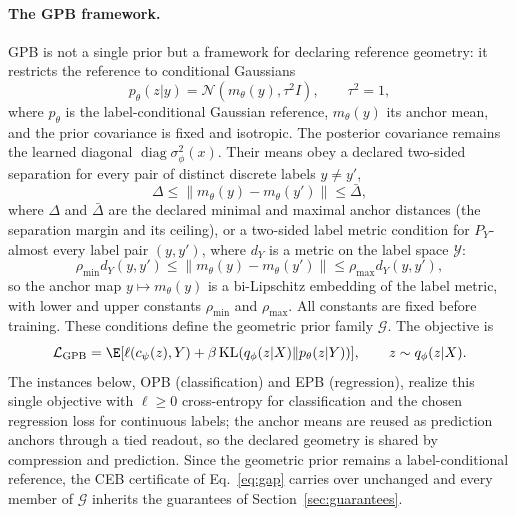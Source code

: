 \paragraph{The GPB framework.}
GPB is not a single prior but a framework for declaring reference geometry: it
restricts the reference to conditional Gaussians
\begin{equation}
p_\theta(z|y)=\mathcal N(m_\theta(y),\tau^2 I),\qquad \tau^2=1,
\label{eq:pgib-covariance}
\end{equation}
where $p_\theta$ is the label-conditional Gaussian reference, $m_\theta(y)$ its
anchor mean, and the prior covariance is fixed and isotropic. The posterior
covariance remains the learned diagonal $\operatorname{diag}\sigma_\phi^2(x)$.
Their means obey a
declared two-sided separation for every pair of distinct discrete labels
$y\ne y'$,
\begin{equation}
\Delta\le\|m_\theta(y)-m_\theta(y')\|\le\bar\Delta,
\label{eq:pgib-separation-condition}
\end{equation}
where $\Delta$ and $\bar\Delta$ are the declared minimal and maximal anchor
distances (the separation margin and its ceiling),
or a two-sided label metric condition for $P_Y$-almost every label pair
$(y,y')$, where $d_Y$ is a metric on the label space $\mathcal Y$:
\begin{equation}
\rho_{\min}d_Y(y,y')\le\|m_\theta(y)-m_\theta(y')\|
\le\rho_{\max}d_Y(y,y'),
\label{eq:pgib-lipschitz}
\end{equation}
so the anchor map $y\mapsto m_\theta(y)$ is a bi-Lipschitz embedding of the label
metric, with lower and upper constants $\rho_{\min}$ and $\rho_{\max}$. All
constants are fixed before training. These conditions define the geometric prior
family $\mathcal G$. The objective is
\begin{equation}
\mathcal L_{\rm GPB}=\E[\ell(c_\psi(z),Y)+\beta\KL(q_\phi(z|X)\|p_\theta(z|Y))],
\qquad z\sim q_\phi(z|X).
\label{eq:pgib-objective}
\end{equation}
The instances below, OPB (classification) and EPB (regression), realize this single
objective with $\ell\ge0$ cross-entropy for classification and the chosen regression
loss for continuous labels; the anchor means are reused as prediction anchors through
a tied readout, so the declared geometry is shared by compression and prediction.
Since the geometric prior remains a label-conditional reference, the CEB certificate
of Eq.~\eqref{eq:gap} carries over unchanged and every member of $\mathcal G$ inherits
the guarantees of Section~\ref{sec:guarantees}.

